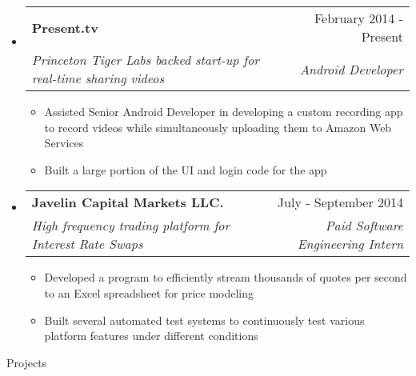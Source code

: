 \documentclass[letterpaper,11pt]{article}
\makeatletter
\newcommand{\resitem}[1]{\item #1 \vspace{-2pt}}
\newcommand{\resheading}[1]{{\large \parashade[.9]{sharpcorners}{\textbf{#1 \vphantom{p\^{E}}}}}}
\newcommand{\ressubheading}[4]{
\begin{tabular*}{6.5in}{l@{\extracolsep{\fill}}r}
		\textbf{#1} & #2 \\
		\textit{#3} & \textit{#4} \\
\end{tabular*}\vspace{-6pt}}
\makeatother
\begin{document}
\begin{itemize}
\item
	\ressubheading{Present.tv}{February 2014 - Present}
		{Princeton Tiger Labs backed start-up for real-time 				sharing videos} {Android Developer}
		\begin {itemize}
		\resitem{Assisted Senior Android Developer in 						developing a custom recording app to record videos 				while simultaneously uploading them to Amazon Web 				Services}
		\resitem{Built a large portion of the UI and login code 			for the app}
		\end{itemize}
\end{itemize}
\begin{itemize}
	\item
		\ressubheading{Javelin Capital Markets LLC.}{July - 					September 2014}
			{High frequency trading platform for Interest Rate 				Swaps}{Paid Software Engineering Intern}
	\begin{itemize}
		\resitem{Developed a program to efficiently stream 					thousands of quotes per second to an Excel 						spreadsheet for price modeling}
		\resitem{Built several automated test systems to 						continuously test various platform features under 				different conditions}
	\end{itemize}
\end{itemize}

\begin{description} 
	\item[Projects] 
\end{description}
\end{document}
